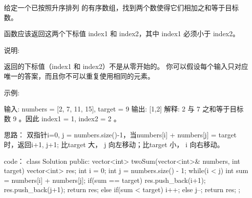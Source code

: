 给定一个已按照升序排列 的有序数组，找到两个数使得它们相加之和等于目标数。

函数应该返回这两个下标值 index1 和 index2，其中 index1 必须小于 index2。

说明:

    返回的下标值（index1 和 index2）不是从零开始的。
    你可以假设每个输入只对应唯一的答案，而且你不可以重复使用相同的元素。

示例:

输入: numbers = [2, 7, 11, 15], target = 9
输出: [1,2]
解释: 2 与 7 之和等于目标数 9 。因此 index1 = 1, index2 = 2 。





























思路：
双指针i=0, j = numbers.size()-1，当numbers[i] + numbers[j] = target 时，返回i+1, j+1; 比target 大， j 向左移动；比target 小， i 向右移动。





























code：
class Solution {
public:
    vector<int> twoSum(vector<int>& numbers, int target) {
        vector<int> res;
        int i = 0;
        int j = numbers.size() - 1;
        while(i < j)
        {
            int sum = numbers[i] + numbers[j];
            if(sum == target)
            {
                res.push_back(i+1);
                res.push_back(j+1);
                return res;
            }
            else if(sum < target)
                i++;
            else j--;
        }
        return res;
    }
};